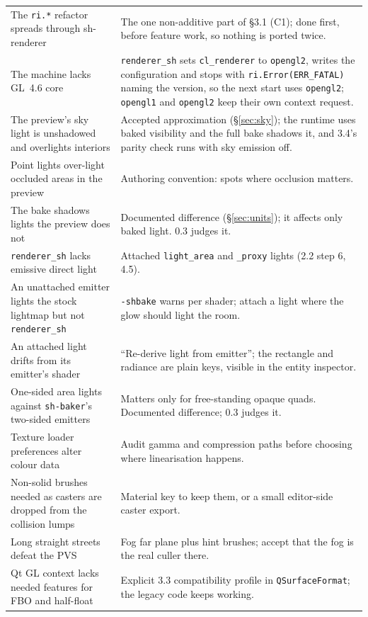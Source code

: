 \documentclass[11pt,a4paper]{article}
\begin{document}
\begin{longtable}{@{}p{}p{}@{}}
The \texttt{ri.*} refactor spreads through sh-renderer &
  The one non-additive part of §3.1 (C1); done first, before feature work, so nothing is ported
  twice. \\
The machine lacks GL~4.6 core &
  \texttt{renderer\_sh} sets \texttt{cl\_renderer} to \texttt{opengl2}, writes the configuration
  and stops with \texttt{ri.Error(ERR\_FATAL)} naming the version, so the next start uses
  \texttt{opengl2}; \texttt{opengl1} and \texttt{opengl2} keep their own context request. \\
The preview's sky light is unshadowed and overlights interiors &
  Accepted approximation (§\ref{sec:sky}); the runtime uses baked visibility and the full bake
  shadows it, and 3.4's parity check runs with sky emission off. \\
Point lights over-light occluded areas in the preview &
  Authoring convention: spots where occlusion matters. \\
The bake shadows lights the preview does not &
  Documented difference (§\ref{sec:units}); it affects only baked light. 0.3 judges it. \\
\texttt{renderer\_sh} lacks emissive direct light &
  Attached \texttt{light\_area} and \texttt{\_proxy} lights (2.2 step 6, 4.5). \\
An unattached emitter lights the stock lightmap but not \texttt{renderer\_sh} &
  \texttt{-shbake} warns per shader; attach a light where the glow should light the room. \\
An attached light drifts from its emitter's shader &
  ``Re-derive light from emitter''; the rectangle and radiance are plain keys, visible in the
  entity inspector. \\
One-sided area lights against \texttt{sh-baker}'s two-sided emitters &
  Matters only for free-standing opaque quads. Documented difference; 0.3 judges it. \\
Texture loader preferences alter colour data &
  Audit gamma and compression paths before choosing where linearisation happens. \\
Non-solid brushes needed as casters are dropped from the collision lumps &
  Material key to keep them, or a small editor-side caster export. \\
Long straight streets defeat the PVS &
  Fog far plane plus hint brushes; accept that the fog is the real culler there. \\
Qt GL context lacks needed features for FBO and half-float &
  Explicit 3.3 compatibility profile in \texttt{QSurfaceFormat}; the legacy code keeps working. \\
\bottomrule
\end{longtable}
\end{document}
